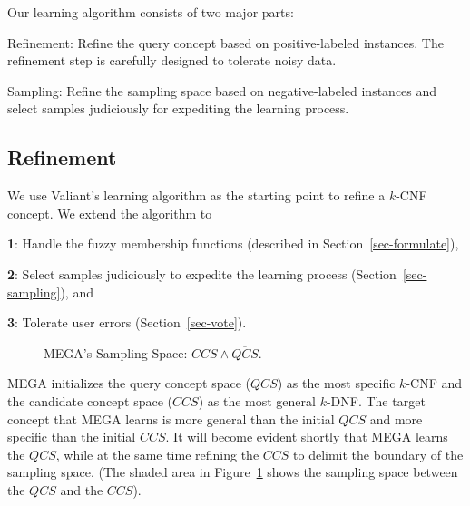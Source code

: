 Our learning algorithm consists of two major parts:
\begin{jlist}
\item Refinement: Refine the query concept based on 
positive-labeled instances. The refinement step 
is carefully designed to tolerate noisy data.
\item Sampling: Refine the sampling space based
on negative-labeled instances and select samples
judiciously for expediting the learning process.
\end{jlist}

\subsection{Refinement}

We use Valiant's learning algorithm \cite{V84}
as the starting point to refine a $k$-CNF concept. 
We extend the algorithm to
\begin{nlist}
\item {\bf 1}: Handle the 
fuzzy membership functions (described in Section~\ref{sec-formulate}), 
\item {\bf 2}: Select samples judiciously to
expedite the learning process (Section~\ref{sec-sampling}), and
\item {\bf 3}: Tolerate user errors (Section~\ref{sec-vote}).
\end{nlist}

\begin{figure}[ht]
\epsfysize=100pt
\centerline{}
\vspace{-.1in}
\caption{MEGA's Sampling Space: $CCS \wedge \overline{QCS}$.}
\vspace{-.1in}
\label{fig-qccs}
\end{figure}
               
MEGA initializes
the query concept space ($QCS$) as the most specific $k$-CNF
and the candidate concept space ($CCS$) as the most general $k$-DNF.
The target concept
that MEGA learns is more general than the initial
$QCS$ and more specific than the initial $CCS$. 
It will become evident shortly that MEGA learns the $QCS$,
while at the same time refining the $CCS$ to delimit
the boundary of the sampling space. (The
shaded area in Figure~\ref{fig-qccs} shows the sampling space
between the $QCS$ and the $CCS$).


